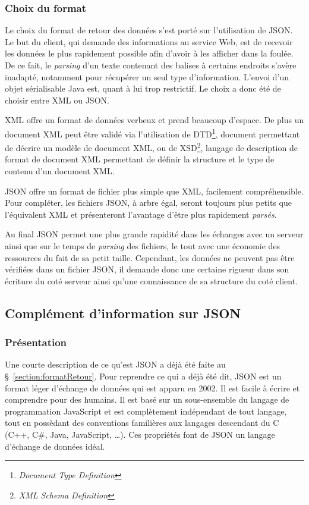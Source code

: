 \subsubsection{Choix du format}

Le choix du format de retour des donn\'ees s'est port\'e sur l'utilisation de JSON.
Le but du client, qui demande des informations au service Web, est de recevoir les donn\'ees le plus rapidement possible afin d'avoir \`a les afficher dans la foul\'ee.
De ce fait, le \textit{parsing} d'un texte contenant des balises \`a certains endroits s'av\`ere inadapt\'e, notamment pour r\'ecup\'erer un seul type d'information.
L'envoi d'un objet s\'erialisable Java est, quant \`a lui trop restrictif. Le choix a donc \'et\'e de choisir entre XML ou JSON.

XML offre un format de donn\'ees verbeux et prend beaucoup d'espace. 
De plus un document XML peut \^etre valid\'e via l'utilisation de DTD\protect\footnote{\textit{Document Type Definition}}, document permettant de d\'ecrire un mod\`ele de document XML, ou de XSD\protect\footnote{\textit{XML Schema Definition}}, langage de description de format de document XML permettant de d\'efinir la structure et le type de contenu d'un document XML.

JSON offre un format de fichier plus simple que XML, facilement compr\'ehensible.
Pour compl\'eter, les fichiers JSON, \`a arbre \'egal, seront toujours plus petits que l'\'equivalent XML et pr\'esenteront l'avantage d'\^etre plus rapidement \textit{pars\'es}.

Au final JSON permet une plus grande rapidit\'e dans les \'echanges avec un serveur ainsi que sur le temps de \textit{parsing} des fichiers, le tout avec une \'economie des ressources du fait de sa petit taille.
Cependant, les donn\'ees ne peuvent pas \^etre v\'erifi\'ees dans un fichier JSON, il demande donc une certaine rigueur dans son \'ecriture du cot\'e serveur ainsi qu'une connaissance de sa structure du cot\'e client.

\subsection{Compl\'ement d'information sur JSON}

\subsubsection{Pr\'esentation}

Une courte description de ce qu'est JSON a d\'ej\`a \'et\'e faite au \S~\ref{section:formatRetour}.
Pour reprendre ce qui a d\'ej\`a \'et\'e dit, JSON est un format l\'eger d'\'echange de donn\'ees qui est apparu en 2002.
Il est facile \`a \'ecrire et comprendre pour des humains.
Il est bas\'e sur un sous-ensemble du langage de programmation JavaScript et est compl\`etement ind\'ependant de tout langage, tout en poss\`edant des conventions famili\`eres aux langages descendant du C (C++, C\#, Java, JavaScript, \ldots).
Ces propri\'et\'es font de JSON un langage d'\'echange de donn\'ees id\'eal.

